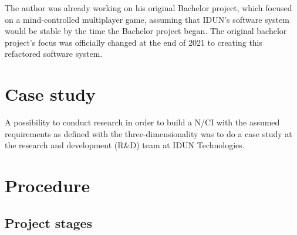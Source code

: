 The author was already working on his original Bachelor project, which focused on a mind-controlled multiplayer game, assuming that IDUN's software system would be stable by the time the Bachelor project began. The original bachelor project's focus was officially changed at the end of 2021 to creating this refactored software system.

\section{Case study}
\label{chapter3-case-study}

A possibility to conduct research in order to build a N/CI with the assumed requirements as defined with the three-dimensionality was to do a case study at the research and development (R\&D) team at IDUN Technologies. 


\section{Procedure}
\label{chapter3-procedure}

\subsection{Project stages}
\label{chapter3-project-stages}




